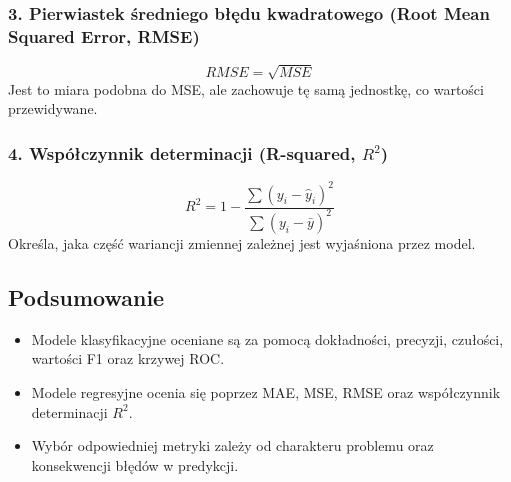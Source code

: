 \subsubsection{3. Pierwiastek średniego błędu kwadratowego (Root Mean Squared Error, RMSE)}
\[
RMSE = \sqrt{MSE}
\]
Jest to miara podobna do MSE, ale zachowuje tę samą jednostkę, co wartości przewidywane.

\subsubsection{4. Współczynnik determinacji (R-squared, \( R^2 \))}
\[
R^2 = 1 - \frac{\sum (y_i - \hat{y}_i)^2}{\sum (y_i - \bar{y})^2}
\]
Określa, jaka część wariancji zmiennej zależnej jest wyjaśniona przez model.

\subsection{Podsumowanie}
\begin{itemize}
    \item Modele klasyfikacyjne oceniane są za pomocą dokładności, precyzji, czułości, wartości F1 oraz krzywej ROC.
    \item Modele regresyjne ocenia się poprzez MAE, MSE, RMSE oraz współczynnik determinacji \( R^2 \).
    \item Wybór odpowiedniej metryki zależy od charakteru problemu oraz konsekwencji błędów w predykcji.
\end{itemize}
